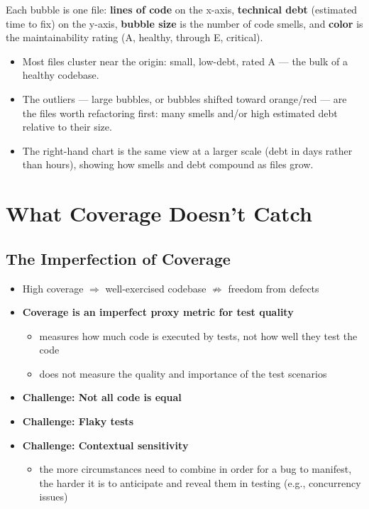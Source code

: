 \begin{exbox}[title=Maintainability overview]
\small
Each bubble is one file: \textbf{lines of code} on the x-axis, \textbf{technical debt} (estimated time to fix) on the y-axis, \textbf{bubble size} is the number of code smells, and \textbf{color} is the maintainability rating (A, healthy, through E, critical).
\begin{itemize}[leftmargin=1.5em, itemsep=3pt]
  \item Most files cluster near the origin: small, low-debt, rated A --- the bulk of a healthy codebase.
  \item The outliers --- large bubbles, or bubbles shifted toward orange/red --- are the files worth refactoring first: many smells and/or high estimated debt relative to their size.
  \item The right-hand chart is the same view at a larger scale (debt in days rather than hours), showing how smells and debt compound as files grow.
\end{itemize}
\end{exbox}

\section{What Coverage Doesn't Catch}

\subsection{The Imperfection of Coverage}

\begin{itemize}
  \item High coverage $\Rightarrow$ well-exercised codebase $\nRightarrow$ freedom from defects
  \item \textbf{Coverage is an imperfect proxy metric for test quality}
  \begin{itemize}
    \item measures how much code is executed by tests, not how well they test the code
    \item does not measure the quality and importance of the test scenarios
  \end{itemize}
  \item \textbf{Challenge: Not all code is equal}
  \item \textbf{Challenge: Flaky tests}
  \item \textbf{Challenge: Contextual sensitivity}
  \begin{itemize}
    \item the more circumstances need to combine in order for a bug to manifest, the harder it is to anticipate and reveal them in testing (e.g., concurrency issues)
  \end{itemize}
\end{itemize}

